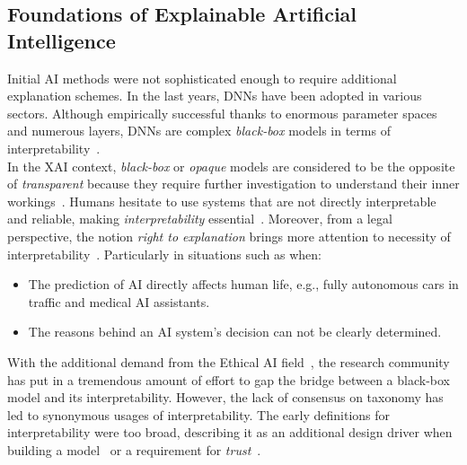 \subsection{Foundations of Explainable Artificial Intelligence}
\label{subsec:explainableArtificialIntelligence_Foundations}
Initial AI methods were not sophisticated enough to require additional explanation schemes. In the last years, DNNs have been adopted in various sectors. Although empirically successful thanks to enormous parameter spaces and numerous layers, DNNs are complex \emph{black-box} models in terms of interpretability~\parencite{CanWeOpenTheBlackBoxOfAI_Castelvecchi}.\\
In the XAI context, \emph{black-box} or \emph{opaque} models are considered to be the opposite of \emph{transparent} because they require further investigation to understand their inner workings~\parencite{TheMythosOfModelInterpretability_Lipton}. Humans hesitate to use systems that are not directly interpretable and reliable, making \emph{interpretability} essential~\parencite{xAIForDesigners_Zhu}. Moreover, from a legal perspective, the notion \emph{right to explanation} brings more attention to necessity of interpretability~\parencite{TheMythosOfModelInterpretability_Lipton}. Particularly in situations such as when:
\begin{itemize}
    \item The prediction of AI directly affects human life, e.g., fully autonomous cars in traffic and medical AI assistants.
    \item The reasons behind an AI system’s decision can not be clearly determined.
\end{itemize}
With the additional demand from the Ethical AI field~\parencite{EURegulationsOnDecisionMaking_Goodman}, the research community has put in a tremendous amount of effort to gap the bridge between a black-box model and its interpretability. However, the lack of consensus on taxonomy has led to synonymous usages of interpretability. The early definitions for interpretability were too broad, describing it as an additional design driver when building a model~\parencite{TheBayesianCaseModel_Kim} or a requirement for \emph{trust}~\parencite{InteractiveAndInterpretableMLModels_Kim}.
